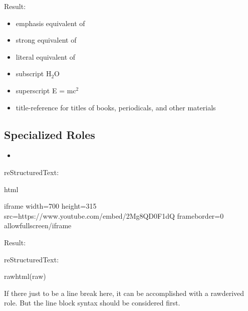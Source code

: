 \documentclass[letterpaper,11pt,english]{sphinxmanual}
\begin{document}
Result:
\begin{itemize}
\item {} 
emphasis \textendash{} equivalent of 

\item {} 
strong \textendash{} equivalent of 

\item {} 
literal \textendash{} equivalent of 

\item {} 
subscript \textendash{} H$_{\text{2}}$O

\item {} 
superscript \textendash{} E = mc$^{\text{2}}$

\item {} 
title-reference \textendash{} for titles of books, periodicals, and other materials

\end{itemize}


\subsection{Specialized Roles}
\label{\detokenize{rtxt:specialized-roles}}\begin{itemize}
\item {} 

\end{itemize}

reStructuredText:

\begin{sphinxVerbatim}[commandchars=\\\{\}]
  html

    \PYGZlt{}iframe width=\PYGZdq{}700\PYGZdq{} height=\PYGZdq{}315\PYGZdq{}
    src=\PYGZdq{}https://www.youtube.com/embed/2Mg8QD0F1dQ\PYGZdq{}
    frameborder=\PYGZdq{}0\PYGZdq{} allowfullscreen\PYGZgt{}\PYGZlt{}/iframe\PYGZgt{}
\end{sphinxVerbatim}

Result:



reStructuredText:

\begin{sphinxVerbatim}[commandchars=\\\{\}]
  raw\PYGZhy{}html(raw)
    

If there just  to be a line break here,
it can be accomplished with a \PYGZdq{}raw\PYGZdq{}\PYGZhy{}derived role.
But the line block syntax should be considered first.
\end{sphinxVerbatim}
\end{document}
